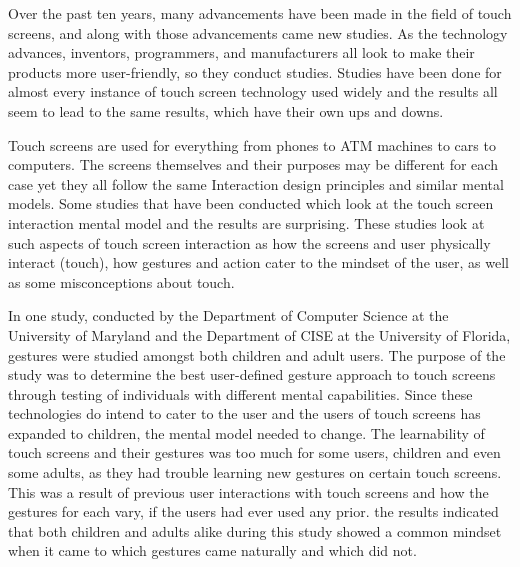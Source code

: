 \documentclass[a4paper]{article}
\begin{document}
     Over the past ten years, many advancements have been made in the field of touch screens, and along with those advancements came new studies. As the technology advances, inventors, programmers, and manufacturers all look to make their products more user-friendly, so they conduct studies. Studies have been done for almost every instance of touch screen technology used widely and the results all seem to lead to the same results, which have their own ups and downs.
     
     Touch screens are used for everything from phones to ATM machines to cars to computers. The screens themselves and their purposes may be different for each case yet they all follow the same Interaction design principles and similar mental models. Some studies that have been conducted which look at the touch screen interaction mental model and the results are surprising. These studies look at such aspects of touch screen interaction as how the screens and user physically interact (touch), how gestures and action cater to the mindset of the user, as well as some misconceptions about touch. 
     
     In one study, conducted by the Department of Computer Science at the University of Maryland and the Department of CISE at the University of Florida, gestures were studied amongst both children and adult users. The purpose of the study was to determine the best user-defined gesture approach to touch screens through testing of individuals with different mental capabilities. Since these technologies do intend to cater to the user and the users of touch screens has expanded to children, the mental model needed to change. The learnability of touch screens and their gestures was too much for some users, children and even some adults, as they had trouble learning new gestures on certain touch screens. This was a result of previous user interactions with touch screens and how the gestures for each vary, if the users had ever used any prior. the results indicated that both children and adults alike during this study showed a common mindset when it came to which gestures came naturally and which did not. 
     
\end{document}
